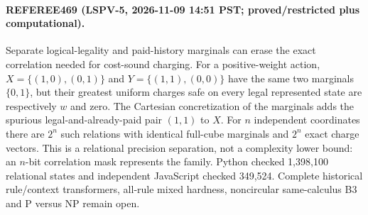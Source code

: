 \paragraph{REFEREE469 (LSPV-5, 2026-11-09 14:51 PST; proved/restricted plus computational).}
Separate logical-legality and paid-history marginals can erase the exact
correlation needed for cost-sound charging.  For a positive-weight action,
$X=\{(1,0),(0,1)\}$ and $Y=\{(1,1),(0,0)\}$ have the same two marginals
$\{0,1\}$, but their greatest uniform charges safe on every legal represented
state are respectively $w$ and zero.  The Cartesian concretization of the
marginals adds the spurious legal-and-already-paid pair $(1,1)$ to $X$.
For $n$ independent coordinates there are $2^n$ such relations with identical
full-cube marginals and $2^n$ exact charge vectors.  This is a relational
precision separation, not a complexity lower bound: an $n$-bit correlation
mask represents the family.  Python checked 1,398,100 relational states and
independent JavaScript checked 349,524.  Complete historical rule/context
transformers, all-rule mixed hardness, noncircular same-calculus B3 and
P versus NP remain open.
